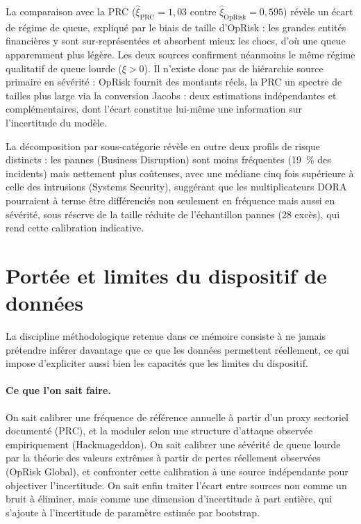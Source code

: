 La comparaison avec la PRC ($\hat{\xi}_{\text{PRC}} = 1{,}03$ contre
$\hat{\xi}_{\text{OpRisk}} = 0{,}595$) révèle un écart de régime de queue,
expliqué par le biais de taille d'OpRisk : les grandes entités financières y
sont sur-représentées et absorbent mieux les chocs, d'où une queue
apparemment plus légère. Les deux sources confirment néanmoins le même régime
qualitatif de queue lourde ($\xi > 0$). Il n'existe donc pas de hiérarchie
\og source primaire\fg{} en sévérité : OpRisk fournit des montants réels, la PRC
un spectre de tailles plus large via la conversion Jacobs : deux
estimations indépendantes et complémentaires, dont l'écart constitue
lui-même une information sur l'incertitude du modèle.

La décomposition par sous-catégorie révèle en outre deux profils de risque
distincts : les pannes (\og Business Disruption\fg{}) sont moins fréquentes
(19~\% des incidents) mais nettement plus coûteuses, avec une médiane cinq
fois supérieure à celle des intrusions (\og Systems Security\fg{}), suggérant que
les multiplicateurs DORA pourraient à terme être différenciés non seulement
en fréquence mais aussi en sévérité, sous réserve de la taille réduite de
l'échantillon \og pannes\fg{} (28 excès), qui rend cette calibration indicative.



\section{Portée et limites du dispositif de données}

La discipline méthodologique retenue dans ce mémoire consiste à ne jamais
prétendre inférer davantage que ce que les données permettent réellement, ce
qui impose d'expliciter aussi bien les capacités que les limites du dispositif.

\paragraph{Ce que l'on sait faire.} On sait calibrer une fréquence de
référence annuelle à partir d'un proxy sectoriel documenté (PRC), et la
moduler selon une structure d'attaque observée empiriquement (Hackmageddon).
On sait calibrer une sévérité de queue lourde par la théorie des valeurs
extrêmes à partir de pertes réellement observées (OpRisk Global), et
confronter cette calibration à une source indépendante pour objectiver
l'incertitude. On sait enfin traiter l'écart entre sources non comme un bruit
à éliminer, mais comme une dimension d'incertitude à part entière, qui
s'ajoute à l'incertitude de paramètre estimée par bootstrap.

